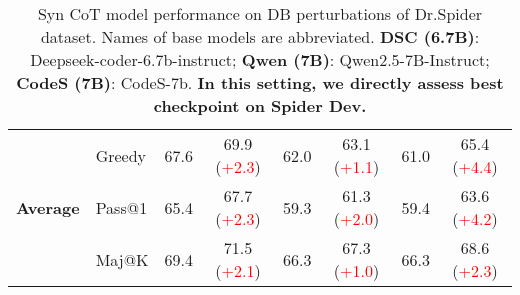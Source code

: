 \begin{table*}[t!]
\begin{adjustbox}{max width=\textwidth}
\begin{tabular}{c | l | c c | c c | c c }
        \multirow{3}{*}{\textbf{Average}} & Greedy & 67.6 & 69.9 (\textcolor{red}{+2.3}) & 62.0 & 63.1 (\textcolor{red}{+1.1}) & 61.0 & 65.4 (\textcolor{red}{+4.4}) \\
& Pass@1 & 65.4 & 67.7 (\textcolor{red}{+2.3}) & 59.3 & 61.3 (\textcolor{red}{+2.0}) & 59.4 & 63.6 (\textcolor{red}{+4.2}) \\
& Maj@K & 69.4 & 71.5 (\textcolor{red}{+2.1}) & 66.3 & 67.3 (\textcolor{red}{+1.0}) & 66.3 & 68.6 (\textcolor{red}{+2.3}) \\

        
        \bottomrule
    \end{tabular}
\end{adjustbox}
    \caption{Syn CoT model performance on DB perturbations of Dr.Spider dataset. Names of base models are abbreviated. \textbf{DSC (6.7B)}: Deepseek-coder-6.7b-instruct; \textbf{Qwen (7B)}: Qwen2.5-7B-Instruct; \textbf{CodeS (7B)}: CodeS-7b. \textbf{In this setting, we directly assess best checkpoint on Spider Dev.}}
    \label{tab:drSpiderDBCoT}
\end{table*}

